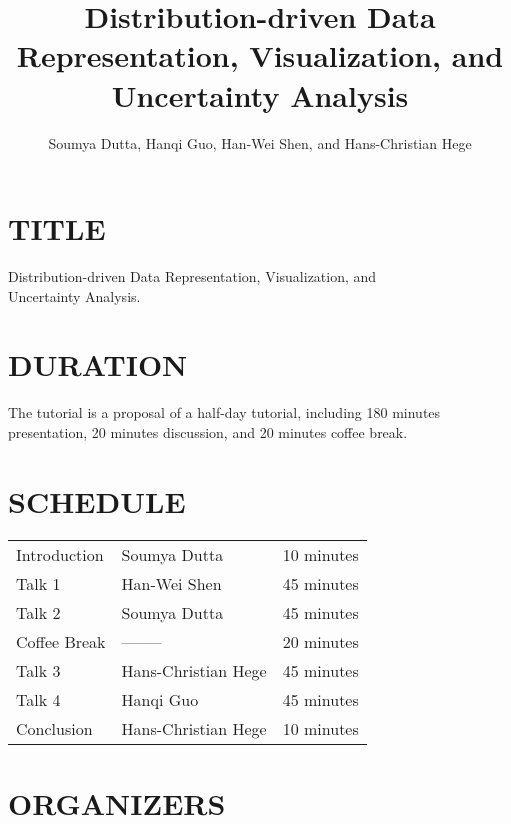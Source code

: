 \documentclass[preprint,journal]{vgtc}       %
\title{Distribution-driven Data Representation, Visualization, and \\ Uncertainty Analysis}
\author{Soumya Dutta, Hanqi Guo, Han-Wei Shen, and Hans-Christian Hege}
\begin{document}


\maketitle

\section*{TITLE}
Distribution-driven Data Representation, Visualization, and \\ Uncertainty Analysis.

\section*{DURATION}
The tutorial is a proposal of a half-day tutorial, including 180 minutes presentation, 20 minutes discussion, and 20 minutes coffee break.

\section*{SCHEDULE}

\vspace{-0.1in}
\begin{table}[H]
\begin{tabular}{lll}
Introduction & Soumya Dutta & 10 minutes\\
Talk 1 & Han-Wei Shen & 45 minutes\\
Talk 2 & Soumya Dutta & 45 minutes\\
Coffee Break & -------- & 20 minutes\\
Talk 3 & Hans-Christian Hege & 45 minutes\\
Talk 4 & Hanqi Guo & 45 minutes\\
Conclusion & Hans-Christian Hege & 10 minutes
\end{tabular}
\end{table}

\section*{ORGANIZERS}
\end{document}
